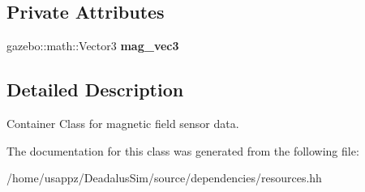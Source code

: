 \subsection*{\-Private \-Attributes}
\begin{DoxyCompactItemize}
\item 
\hypertarget{classMAG_ac734724869ac0d1261fd5dc3a3e6d54a}{gazebo\-::math\-::\-Vector3 {\bfseries mag\-\_\-vec3}}\label{classMAG_ac734724869ac0d1261fd5dc3a3e6d54a}

\end{DoxyCompactItemize}


\subsection{\-Detailed \-Description}
\-Container \-Class for magnetic field sensor data. 

\-The documentation for this class was generated from the following file\-:\begin{DoxyCompactItemize}
\item 
/home/usappz/\-Deadalus\-Sim/source/dependencies/resources.\-hh\end{DoxyCompactItemize}
